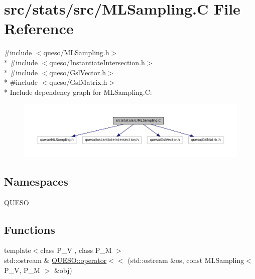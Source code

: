 \hypertarget{_m_l_sampling_8_c}{\section{src/stats/src/\-M\-L\-Sampling.C File Reference}
\label{_m_l_sampling_8_c}
}
{\ttfamily \#include $<$queso/\-M\-L\-Sampling.\-h$>$}\\*
{\ttfamily \#include $<$queso/\-Instantiate\-Intersection.\-h$>$}\\*
{\ttfamily \#include $<$queso/\-Gsl\-Vector.\-h$>$}\\*
{\ttfamily \#include $<$queso/\-Gsl\-Matrix.\-h$>$}\\*
Include dependency graph for M\-L\-Sampling.\-C\-:
\nopagebreak
\begin{figure}[H]
\begin{center}
\leavevmode
\includegraphics[width=350pt]{_m_l_sampling_8_c__incl}
\end{center}
\end{figure}
\subsection*{Namespaces}
\begin{DoxyCompactItemize}
\item 
\hyperlink{namespace_q_u_e_s_o}{Q\-U\-E\-S\-O}
\end{DoxyCompactItemize}
\subsection*{Functions}
\begin{DoxyCompactItemize}
\item 
{\footnotesize template$<$class P\-\_\-\-V , class P\-\_\-\-M $>$ }\\std\-::ostream \& \hyperlink{namespace_q_u_e_s_o_a8da6c5c5bdc3addfa97ccad5eebbfd7c}{Q\-U\-E\-S\-O\-::operator$<$$<$} (std\-::ostream \&os, const M\-L\-Sampling$<$ P\-\_\-\-V, P\-\_\-\-M $>$ \&obj)
\end{DoxyCompactItemize}
